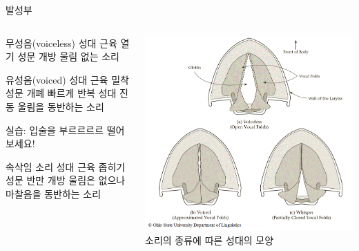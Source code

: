 \documentclass[11pt, aspectratio=169]{beamer}
\begin{document}
\begin{frame}[t]{발성부}
    \begin{columns}
        \begin{column}{0.5\textwidth}
            \begin{block}{무성음(voiceless)}
                성대 근육 열기 \rightarrow 성문 개방 \rightarrow 울림 없는 소리
            \end{block}
            \begin{block}{유성음(voiced)}
                성대 근육 밀착 \rightarrow 성문 개폐 빠르게 반복 \rightarrow 성대 진동 \rightarrow 울림을 동반하는 소리
            \end{block}
            {\small 실습: 입술을 부르르르르 떨어보세요!}
            \begin{block}{속삭임 소리}
                성대 근육 좁히기 \rightarrow 성문 반만 개방 \rightarrow 울림은 없으나 마찰음을 동반하는 소리
            \end{block}
        \end{column}
        \begin{column}{0.43\textwidth}
            \includegraphics[width=1.0\textwidth]{img/VocalFolds.png}\\
            소리의 종류에 따른 성대의 모양
        \end{column}
    \end{columns}
\end{frame}
\end{document}
